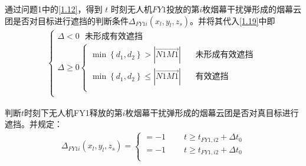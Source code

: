 \documentclass[../main.tex]{subfiles}
\begin{document}
\begin{itemize}
\par 通过问题1中的\eqref{1.12}，得到 $t$ 时刻无人机$FY1$投放的第$i$枚烟幕干扰弹形成的烟幕云团是否对目标进行遮挡的判断条件$\Delta _{FY1i}\left( x_l,y_l,z_s \right) $。并将其代入\eqref{1.19}中即
\begin{align}\label{1.19}
	\left\{ \begin{array}{l}
	\varDelta <0\ \ \ \text{未形成有效遮挡}\\
	\varDelta \ge 0\left\{ \begin{array}{l}
	\min \left\{ d_1,d_2 \right\} >\left| \overrightarrow{N1M1} \right|\ \ \ \ \ \ \ \ \text{未形成有效遮挡}\\
	\min \left\{ d_1,d_2 \right\} \le \left| \overrightarrow{N1M1} \right|\ \ \ \ \ \ \ \ \text{有效遮挡}\\
\end{array} \right.\\
\end{array} \right. 
\end{align}
\par 判断$t$时刻下无人机FY1释放的第$i$枚烟幕干扰弹形成的烟幕云团是否对真目标进行遮挡。并规定： 
\begin{align}\label{14.9}
	\Delta _{FY1i}\left( x_l,y_l,z_s \right) =\left\{ \begin{array}{l}
	=-1\ \ \ \ \ \ \ \ \ \ t\ge t_{FY1,i2}+\Delta t_0\\
	=-1\ \ \ \ \ \ \ \ \ \ t\ge t_{FY1,i2}+\Delta t_0\\
\end{array} \right.
\end{align}
\end{itemize}
\end{document}

